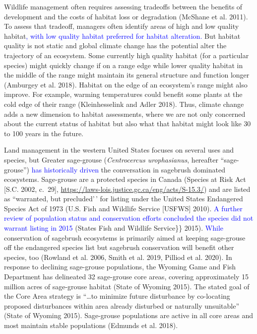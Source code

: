\documentclass[
  12pt,
]{article}
\begin{document}
Wildlife management often requires assessing tradeoffs between the benefits of development and the costs of habitat loss or degradation (McShane et al. 2011).
To assess that tradeoff, managers often identify areas of high and low quality habitat\textcolor{blue}{, with low quality habitat preferred for habitat alteration.}
But habitat quality is not static and global climate change has the potential alter the trajectory of an ecosystem.
Some currently high quality habitat (for a particular species) might quickly change if on a range edge while lower quality habitat in the middle of the range might maintain its general structure and function longer (Amburgey et al. 2018).
Habitat on the edge of an ecosystem's range might also improve.
For example, warming temperatures could benefit some plants at the cold edge of their range (Kleinhesselink and Adler 2018).
Thus, climate change adds a new dimension to habitat assessments, where we are not only concerned about the current status of habitat but also what that habitat might look like 30 to 100 years in the future.

Land management in the western United States focuses on several uses and species, but Greater sage-grouse (\emph{Centrocercus urophasianus}, hereafter ``sage-grouse'') \textcolor{blue}{has historically driven} the conversation in sagebrush dominated ecosystems.
Sage-grouse are a protected species in Canada (Species at Risk Act {[}S.C. 2002, c.~29{]}, \url{https://laws-lois.justice.gc.ca/eng/acts/S-15.3/}) and are listed as ``warranted, but precluded'\,' for listing under the United States Endangered Species Act of 1973 (U.S. Fish and Wildlife Service
{[}USFWS{]} 2010).
\textcolor{blue}{A further review of population status and conservation efforts concluded the species did not warrant listing in 2015} (States Fish and Wildlife Service\}\} 2015).
\textcolor{blue}{While} conservation of sagebrush ecosystems is primarily aimed at keeping sage-grouse off the endangered species list but sagebrush conservation will benefit other species, too (Rowland et al. 2006, Smith et al. 2019, Pilliod et al. 2020).
In response to declining sage-grouse populations, the Wyoming Game and Fish Department has delineated 32 sage-grouse core areas, covering approximately 15 million acres of sage-grouse habitat (State of Wyoming 2015).
The stated goal of the Core Area strategy is ``\ldots to minimize future disturbance by co-locating proposed disturbances within area already disturbed or naturally unsuitable'' (State of Wyoming 2015).
Sage-grouse populations are active in all core areas and most maintain stable populations (Edmunds et al. 2018).
\end{document}
